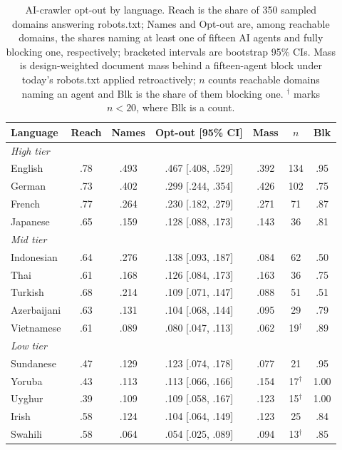 \documentclass[11pt]{article}
\begin{document}
\begin{table}[t]
\centering
\scriptsize
\setlength{\tabcolsep}{3pt}
\begin{tabular}{lcccccc}
\toprule
Language & Reach & Names & Opt-out [95\% CI] & Mass & $n$ & Blk \\
\midrule
\multicolumn{7}{l}{\emph{High tier}}\\
English & .78 & .493 & .467 [.408, .529] & .392 & 134 & .95 \\
German & .73 & .402 & .299 [.244, .354] & .426 & 102 & .75 \\
French & .77 & .264 & .230 [.182, .279] & .271 & 71 & .87 \\
Japanese & .65 & .159 & .128 [.088, .173] & .143 & 36 & .81 \\
\multicolumn{7}{l}{\emph{Mid tier}}\\
Indonesian & .64 & .276 & .138 [.093, .187] & .084 & 62 & .50 \\
Thai & .61 & .168 & .126 [.084, .173] & .163 & 36 & .75 \\
Turkish & .68 & .214 & .109 [.071, .147] & .088 & 51 & .51 \\
Azerbaijani & .63 & .131 & .104 [.068, .144] & .095 & 29 & .79 \\
Vietnamese & .61 & .089 & .080 [.047, .113] & .062 & 19$^\dagger$ & .89 \\
\multicolumn{7}{l}{\emph{Low tier}}\\
Sundanese & .47 & .129 & .123 [.074, .178] & .077 & 21 & .95 \\
Yoruba & .43 & .113 & .113 [.066, .166] & .154 & 17$^\dagger$ & 1.00 \\
Uyghur & .39 & .109 & .109 [.058, .167] & .123 & 15$^\dagger$ & 1.00 \\
Irish & .58 & .124 & .104 [.064, .149] & .123 & 25 & .84 \\
Swahili & .58 & .064 & .054 [.025, .089] & .094 & 13$^\dagger$ & .85 \\
\bottomrule
\end{tabular}
\caption{AI-crawler opt-out by language. Reach is the share of 350 sampled domains answering robots.txt; Names and Opt-out are, among reachable domains, the shares naming at least one of fifteen AI agents and fully blocking one, respectively; bracketed intervals are bootstrap 95\% CIs. Mass is design-weighted document mass behind a fifteen-agent block under today's robots.txt applied retroactively; $n$ counts reachable domains naming an agent and Blk is the share of them blocking one. $^\dagger$ marks $n < 20$, where Blk is a count.}
\label{tab:main}
\end{table}
\end{document}
